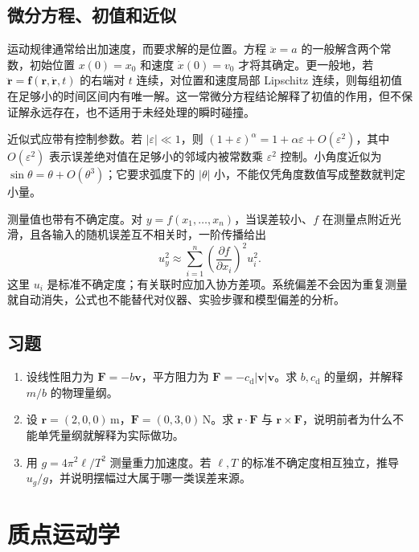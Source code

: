 \documentclass[UTF8,12pt,a4paper,fontset=fandol]{ctexbook}
\begin{document}
\section{微分方程、初值和近似}
运动规律通常给出加速度，而要求解的是位置。方程 $\ddot x=a$ 的一般解含两个常数，初始位置 $x(0)=x_0$ 和速度 $\dot x(0)=v_0$ 才将其确定。更一般地，若 $\ddot{\mathbf r}=\mathbf f(\mathbf r,\dot{\mathbf r},t)$ 的右端对 $t$ 连续，对位置和速度局部 Lipschitz 连续，则每组初值在足够小的时间区间内有唯一解。这一常微分方程结论解释了初值的作用，但不保证解永远存在，也不适用于未经处理的瞬时碰撞。

近似式应带有控制参数。若 $|\varepsilon|\ll1$，则 $(1+\varepsilon)^\alpha=1+\alpha\varepsilon+O(\varepsilon^2)$，其中 $O(\varepsilon^2)$ 表示误差绝对值在足够小的邻域内被常数乘 $\varepsilon^2$ 控制。小角度近似为 $\sin\theta=\theta+O(\theta^3)$；它要求弧度下的 $|\theta|$ 小，不能仅凭角度数值写成整数就判定小量。

测量值也带有不确定度。对 $y=f(x_1,\ldots,x_n)$，当误差较小、$f$ 在测量点附近光滑，且各输入的随机误差互不相关时，一阶传播给出
\begin{equation}
 u_y^2\approx\sum_{i=1}^n\left(\frac{\partial f}{\partial x_i}\right)^2u_i^2.
 \label{eq:mech-uncertainty}
\end{equation}
这里 $u_i$ 是标准不确定度；有关联时应加入协方差项。系统偏差不会因为重复测量就自动消失，公式也不能替代对仪器、实验步骤和模型偏差的分析。

\section{习题}
\begin{enumerate}[label=\thechapter.\arabic*,ref=\thechapter.\arabic*]
\item\label{exr:mech-dimension} 设线性阻力为 $\mathbf F=-b\mathbf v$，平方阻力为 $\mathbf F=-c_{\mathrm d}|\mathbf v|\mathbf v$。求 $b,c_{\mathrm d}$ 的量纲，并解释 $m/b$ 的物理量纲。
\item\label{exr:mech-cross} 设 $\mathbf r=(2,0,0)\,\mathrm m$，$\mathbf F=(0,3,0)\,\mathrm N$。求 $\mathbf r\cdot\mathbf F$ 与 $\mathbf r\times\mathbf F$，说明前者为什么不能单凭量纲就解释为实际做功。
\item\label{exr:mech-error} 用 $g=4\pi^2\ell/T^2$ 测量重力加速度。若 $\ell,T$ 的标准不确定度相互独立，推导 $u_g/g$，并说明摆幅过大属于哪一类误差来源。
\end{enumerate}

\chapter{质点运动学}
\label{chap:mech-kinematics}
\end{document}
